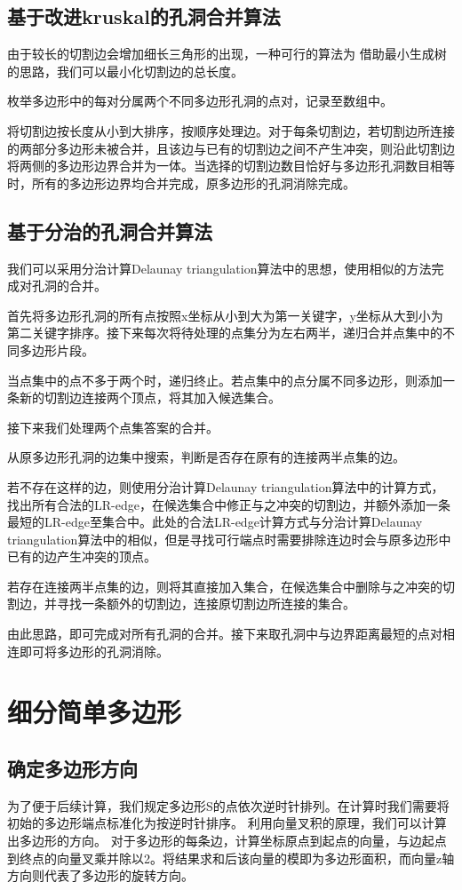 \subsection{基于改进kruskal的孔洞合并算法}
由于较长的切割边会增加细长三角形的出现，一种可行的算法为
借助最小生成树的思路，我们可以最小化切割边的总长度。

枚举多边形中的每对分属两个不同多边形孔洞的点对，记录至数组中。

将切割边按长度从小到大排序，按顺序处理边。对于每条切割边，若切割边所连接的两部分多边形未被合并，且该边与已有的切割边之间不产生冲突，则沿此切割边将两侧的多边形边界合并为一体。当选择的切割边数目恰好与多边形孔洞数目相等时，所有的多边形边界均合并完成，原多边形的孔洞消除完成。

\subsection{基于分治的孔洞合并算法}
我们可以采用分治计算Delaunay triangulation算法中的思想，使用相似的方法完成对孔洞的合并。

首先将多边形孔洞的所有点按照x坐标从小到大为第一关键字，y坐标从大到小为第二关键字排序。接下来每次将待处理的点集分为左右两半，递归合并点集中的不同多边形片段。

当点集中的点不多于两个时，递归终止。若点集中的点分属不同多边形，则添加一条新的切割边连接两个顶点，将其加入候选集合。

接下来我们处理两个点集答案的合并。

从原多边形孔洞的边集中搜索，判断是否存在原有的连接两半点集的边。

若不存在这样的边，则使用分治计算Delaunay triangulation算法中的计算方式，找出所有合法的LR-edge，在候选集合中修正与之冲突的切割边，并额外添加一条最短的LR-edge至集合中。此处的合法LR-edge计算方式与分治计算Delaunay triangulation算法中的相似，但是寻找可行端点时需要排除连边时会与原多边形中已有的边产生冲突的顶点。

若存在连接两半点集的边，则将其直接加入集合，在候选集合中删除与之冲突的切割边，并寻找一条额外的切割边，连接原切割边所连接的集合。

由此思路，即可完成对所有孔洞的合并。接下来取孔洞中与边界距离最短的点对相连即可将多边形的孔洞消除。

\section{细分简单多边形}


\subsection{确定多边形方向}
为了便于后续计算，我们规定多边形S的点依次逆时针排列。在计算时我们需要将初始的多边形端点标准化为按逆时针排序。
利用向量叉积的原理，我们可以计算出多边形的方向。
对于多边形的每条边，计算坐标原点到起点的向量，与边起点到终点的向量叉乘并除以2。将结果求和后该向量的模即为多边形面积，而向量z轴方向则代表了多边形的旋转方向。

